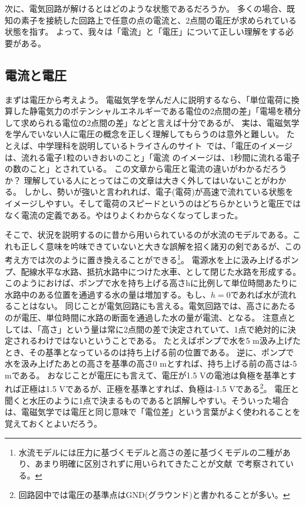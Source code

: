 \documentclass{ltjsreport}
\begin{document}
次に、電気回路が解けるとはどのような状態であるだろうか。
多くの場合、既知の素子を接続した回路上で任意の点の電流と、2点間の電圧が求められている状態を指す。
よって、我々は「電流」と「電圧」について正しい理解をする必要がある。

\subsection{電流と電圧}
まずは電圧から考えよう。
電磁気学を学んだ人に説明するなら、「単位電荷に換算した静電気力のポテンシャルエネルギーである電位の2点間の差」「電場を積分して求められる電位の2点間の差」などと言えば十分であるが、
実は、電磁気学を学んでいない人に電圧の概念を正しく理解してもらうのは意外と難しい。
たとえば、中学理科を説明しているトライさんのサイト~\cite{TRY}では、「電圧のイメージは、流れる電子1粒のいきおいのこと」「電流 のイメージは、1秒間に流れる電子の数のこと」とされている。
この文章から電圧と電流の違いがわかるだろうか？
理解している人にとってはこの文章は大きく外してはいないことがわかる。
しかし、勢いが強いと言われれば、電子(電荷)が高速で流れている状態をイメージしやすい。そして電荷のスピードというのはどちらかというと電圧ではなく電流の定義である。やはりよくわからなくなってしまった。

そこで、状況を説明するのに昔から用いられているのが水流のモデルである。これも正しく意味を吟味できていないと大きな誤解を招く諸刃の剣であるが、この考え方では次のように置き換えることができる\footnote{水流モデルには圧力に基づくモデルと高さの差に基づくモデルの二種があり、あまり明確に区別されずに用いられてきたことが文献~\cite{WATER}で考察されている。}。
電源\leftrightarrow 水を上に汲み上げるポンプ、配線\leftrightarrow 水平な水路、抵抗\leftrightarrow 水路中につけた水車、として閉じた水路を形成する。このようにおけば、ポンプで水を持ち上げる高さhに比例して単位時間あたりに水路中のある位置を通過する水の量は増加する。もし、$h=0$であれば水が流れることはない。
同じことが電気回路にも言える。電気回路では、高さにあたるのが電圧、単位時間に水路の断面を通過した水の量が電流、となる。
注意点としては、「高さ」という量は常に2点間の差で決定されていて、1点で絶対的に決定されるわけではないということである。
たとえばポンプで水を5 \si{\m}汲み上げたとき、その基準となっているのは持ち上げる前の位置である。
逆に、ポンプで水を汲み上げたあとの高さを基準の高さ0 \si{\m}とすれば、持ち上げる前の高さは-5 \si{\m}である。
おなじことが電圧にも言えて、電圧が1.5 \si{\V}の電池は負極を基準とすれば正極は1.5 \si{\V}であるが、正極を基準とすれば、負極は-1.5 \si{\V}である\footnote{回路図中では電圧の基準点はGND(グラウンド)と書かれることが多い。}。
電圧と聞くと水圧のように1点で決まるものであると誤解しやすい。そういった場合は、電磁気学では電圧と同じ意味で「電位差」という言葉がよく使われることを覚えておくとよいだろう。
\end{document}
